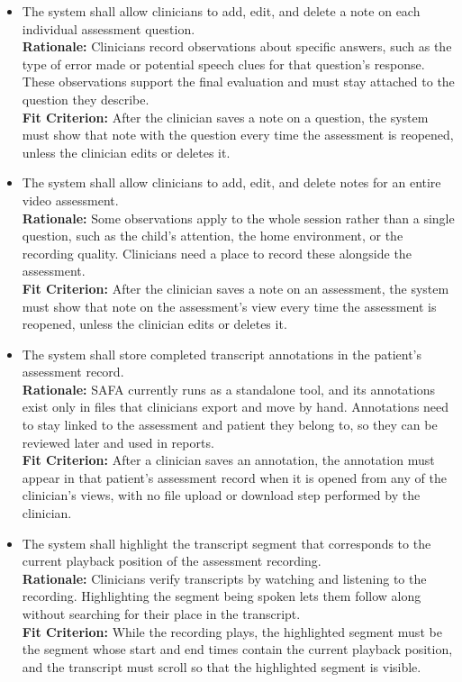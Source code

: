 \documentclass[12pt]{article}
\newcounter{reqnum} %
\newcommand{\rthereqnum}{FR\thereqnum}
\begin{document}
\begin{itemize}
\item[\textbf{\rthereqnum} \label{FR_QuestionNotes}:] The system shall allow clinicians to add, edit, and delete a note on each individual assessment question.
\\ \textbf{Rationale:} Clinicians record observations about specific answers, such as the type of error made or potential speech clues for that question's response. These observations support the final evaluation and must stay attached to the question they describe.
\\ \textbf{Fit Criterion:} After the clinician saves a note on a question, the system must show that note with the question every time the assessment is reopened, unless the clinician edits or deletes it.

\item[\textbf{\rthereqnum} \label{FR_AssessmentNotes}:] The system shall allow clinicians to add, edit, and delete notes for an entire video assessment.
\\ \textbf{Rationale:} Some observations apply to the whole session rather than a single question, such as the child’s attention, the home environment, or the recording quality. Clinicians need a place to record these alongside the assessment.
\\ \textbf{Fit Criterion:} After the clinician saves a note on an assessment, the system must show that note on the assessment’s view every time the assessment is reopened, unless the clinician edits or deletes it.

\item[\textbf{\rthereqnum} \label{FR_AnnotationsInRecord}:] The system shall store completed transcript annotations in the patient’s assessment record.
\\ \textbf{Rationale:} SAFA currently runs as a standalone tool, and its annotations exist only in files that clinicians export and move by hand. Annotations need to stay linked to the assessment and patient they belong to, so they can be reviewed later and used in reports.
\\ \textbf{Fit Criterion:} After a clinician saves an annotation, the annotation must appear in that patient’s assessment record when it is opened from any of the clinician’s views, with no file upload or download step performed by the clinician.

\item[\textbf{\rthereqnum} \label{FR_TranscriptHighlight}:]The system shall highlight the transcript segment that corresponds to the current playback position of the assessment recording.
\\ \textbf{Rationale:} Clinicians verify transcripts by watching and listening to the recording. Highlighting the segment being spoken lets them follow along without searching for their place in the transcript.
\\ \textbf{Fit Criterion:} While the recording plays, the highlighted segment must be the segment whose start and end times contain the current playback position, and the transcript must scroll so that the highlighted segment is visible.


\end{itemize}
\end{document}
